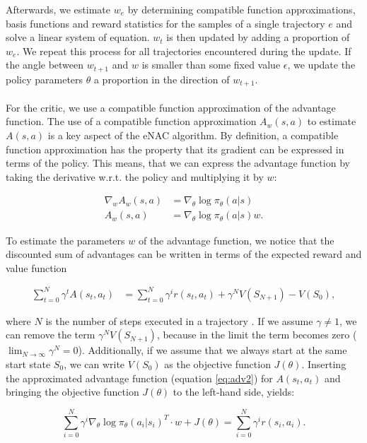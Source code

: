Afterwards, we estimate $w_e$ by determining compatible function approximations, basis functions and reward statistics for the samples of a single trajectory $e$ and solve a linear system of equation. $w_t$ is then updated by adding a proportion of $w_e$. We repeat this process for all trajectories encountered during the update. If the angle between $w_{t+1}$ and $w$ is smaller than some fixed value $\epsilon$, we update the policy parameters $\theta$ a proportion in the direction of $w_{t+1}$.
\\\\
 For the critic, we use a compatible function approximation of the advantage function. The use of a compatible function approximation $A_w(s, a)$ to estimate $A(s, a)$ \citep{sutton2000policy} is a key aspect of the eNAC algorithm. By definition, a compatible function approximation has the property that its gradient can be expressed in terms of the policy. This means, that we can express the advantage function by taking the derivative w.r.t. the policy and multiplying it by $w$:

\begin{align}
\nabla_w A_w(s,a) &= \nabla_{\theta} \log \pi_{\theta}(a|s)\label{eq:adv1}\\
A_w(s,a) &= \nabla_{\theta} \log \pi_{\theta}(a|s)w. \label{eq:adv2}
\end{align}

\noindent To estimate the parameters $w$ of the advantage function, we notice that the discounted sum of advantages can be written in terms of the expected reward and value function

\begin{align}
\sum_{t = 0}^{N}\gamma^t A(s_t, a_t) &= \sum_{t = 0}^{N}\gamma^i r(s_t, a_t) + \gamma^N V(S_{N+1}) - V(S_0),
\end{align}

\noindent where $N$ is the number of steps executed in a trajectory \citep{peters2005natural}. If we assume $\gamma \neq 1$, we can remove the term $\gamma^N V(S_{N+1})$, because in the limit the term becomes zero ($\lim_{N \rightarrow \infty}\gamma^N = 0$). Additionally, if we assume that we always start at the same start state $S_0$, we can write $V(S_0)$ as the objective function $J(\theta)$. Inserting the approximated advantage function (equation \ref{eq:adv2}) for $A(s_t, a_t)$ and bringing the objective function $J(\theta)$ to the left-hand side, yields:

\begin{equation}
	\sum_{i = 0}^{N} \gamma^i \nabla_{\theta} \log \pi_{\theta}(a_i | s_i)^T \cdot w + J(\theta) = \sum_{i = 0}^{N}\gamma^i r(s_i, a_i).
\end{equation}

